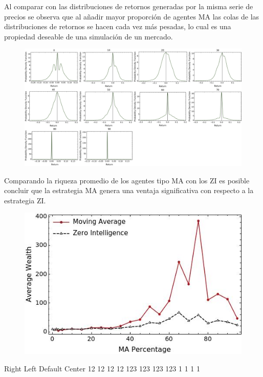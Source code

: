 \markdownRendererInterblockSeparator
{}Al comparar con las distribuciones de retornos generadas por la misma serie de precios se observa que al añadir mayor proporción de agentes MA las colas de las distribuciones de retornos se hacen cada vez más pesadas, lo cual es una propiedad deseable de una simulación de un mercado.\markdownRendererInterblockSeparator
{}\begin{figure}[h!] \centering \includegraphics[scale=0.2]{img/dist_prices.png} \end{figure}\markdownRendererInterblockSeparator
{}\markdownRendererHorizontalRule{}\markdownRendererInterblockSeparator
{}\markdownRendererInterblockSeparator
{}Comparando la riqueza promedio de los agentes tipo MA con los ZI es posible concluir que la estrategia MA genera una ventaja significativa con respecto a la estrategia ZI.\markdownRendererInterblockSeparator
{}\begin{figure}[h!] \centering \includegraphics[scale=0.2]{img/wealth_comparison.jpeg} \end{figure}\markdownRendererInterblockSeparator
{}\markdownRendererHorizontalRule{}\markdownRendererInterblockSeparator
{}\markdownRendererInterblockSeparator
{}%
{{Right}%
{Left}%
{Default}%
{Center}%
}%
{{12}%
{12}%
{12}%
{12}%
}%
{{123}%
{123}%
{123}%
{123}%
}%
{{1}%
{1}%
{1}%
{1}%
}%
\markdownRendererInterblockSeparator
{}\markdownRendererHorizontalRule{}\relax